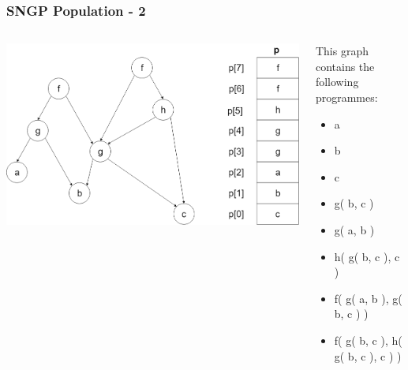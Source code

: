 \documentclass{beamer}
\begin{document}
		\begin{frame}
			\frametitle{SNGP Population - 2}
			
			\begin{columns}
				
				\begin{column}{0.4\textwidth}
					
					\includegraphics[scale=0.14]{resources/9_sngp_graph_no_array}
					
				\end{column}
			
				\begin{column}{0.6\textwidth}
					
					This graph contains the following programmes:
					
					\begin{itemize}
						\item a
						\item b
						\item c
						\item g( b, c )
						\item g( a, b )
						\item h( g( b, c ), c )
						\item f( g( a, b ), g( b, c ) )
						\item f( g( b, c ), h( g( b, c ), c ) )
					\end{itemize}
					
				\end{column}
				
			\end{columns}
			
		\end{frame}
	
\end{document}
